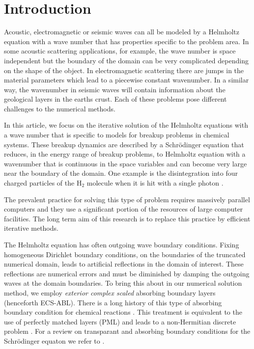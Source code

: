 \documentclass[mathpazo]{cicp}
\theoremstyle{definition}
\numberwithin{equation}{section}
\providecommand{\hbz}{}
\begin{document}
\section{Introduction}
\label{sec1}
Acoustic, electromagnetic or seismic waves can all be modeled by a
Helmholtz equation with a wave number that has properties specific to
the problem area.  In some acoustic scattering applications, for
example, the wave number is space independent but the boundary of the
domain can be very complicated depending on the shape of the object.
In electromagnetic scattering there are jumps in the material
parameters which lead to a piecewise constant wavenumber.  In a
similar way, the wavenumber in seismic waves will contain information
about the geological layers in the earths crust.  Each of these
problems pose different challenges to the numerical methods.

In this article, we focus on the iterative solution of the Helmholtz
equations with a wave number that is specific to models for breakup
problems in chemical systems. These breakup dynamics are described by
a Schr\"odinger equation that reduces, in the energy range of breakup
problems, to Helmholtz equation with a wavenumber that is continuous
in the space variables and can become very large near the boundary of
the domain. One example is the disintegration into four charged
particles of the H$_2$ molecule when it is hit with a single photon
\cite{Wim05}.

The \hbz{prevalent practice for solving this type of problem} requires massively parallel
computers \cite{taylor2002computational} and \hbz{they use}
a significant portion of the resources of large computer
facilities.  The long term aim of \hbz{this research} is
to replace this practice by efficient iterative methods.

The Helmholtz equation \hbz{has often} outgoing wave boundary conditions.
Fixing homogeneous Dirichlet boundary conditions, on the boundaries of
the truncated numerical domain, leads to artificial reflections in the
domain of interest. These reflections are numerical errors and must be
diminished by damping the outgoing waves at the domain boundaries. To
bring this about in our numerical solution method, we employ {\it
  exterior complex scaled} \cite{S79} absorbing boundary layers
(henceforth ECS-ABL). There is a long history of this type of
absorbing boundary condition for chemical reactions
\cite{moiseyev1998}. This treatment is equivalent to the use of
perfectly matched layers (PML) \cite{B94,CW94} and leads to a
non-Hermitian discrete problem \cite{reps2009}.  For a review on
transparant and absorbing boundary conditions for the Schr\"odinger
equaton we refer to \cite{antoine2008review}.
  
\end{document}
